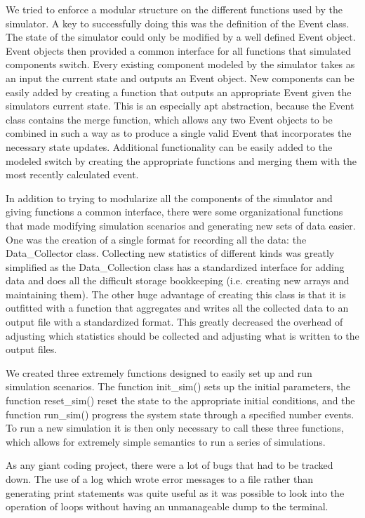 \documentclass[11pt]{article}%
\begin{document}
We tried to enforce a modular structure on the different functions used by the simulator.  A key to successfully doing this was the definition of the Event class.  The state of the simulator could only be modified by a well defined Event object.  Event objects then provided a common interface for all functions that simulated components switch.  Every existing component modeled by the simulator takes as an input the current state and outputs an Event object.  New components can be easily added by creating a function that outputs an appropriate Event given the simulators current state.  This is an especially apt abstraction, because the Event class contains the merge function, which allows any two Event objects to be combined in such a way as to produce a single valid Event that incorporates the necessary state updates.  Additional functionality can be easily added to the modeled switch by creating the appropriate functions and merging them with the most recently calculated event.

In addition to trying to modularize all the components of the simulator and giving functions a common interface, there were some organizational functions that made modifying simulation scenarios and generating new sets of data easier.  One was the creation of a single format for recording all the data: the Data\_Collector class.  Collecting new statistics of different kinds was greatly simplified as the Data\_Collection class has a standardized interface for adding data and does all the difficult storage bookkeeping (i.e. creating new arrays and maintaining them).  The other huge advantage of creating this class is that it is outfitted with a function that aggregates and writes all the collected data to an output file with a standardized format.  This greatly decreased the overhead of adjusting which statistics should be collected and adjusting what is written to the output files.

We created three extremely functions designed to easily set up and run simulation scenarios.  The function init\_sim() sets up the initial parameters, the function reset\_sim() reset the state to the appropriate initial conditions, and the function run\_sim() progress the system state through a specified number events.  To run a new simulation it is then only necessary to call these three functions, which allows for extremely simple semantics to run a series of simulations.

As any giant coding project, there were a lot of bugs that had to be tracked down.  The use of a log which wrote error messages to a file rather than generating print statements was quite useful as it was possible to look into the operation of loops without having an unmanageable dump to the terminal.
\end{document}
